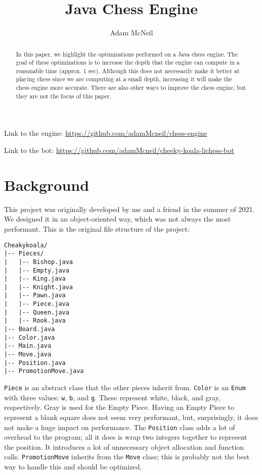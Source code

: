 \documentclass[sigconf]{acmart}
\begin{document}
\title{Java Chess Engine}

\author{Adam McNeil}


\begin{abstract}
In this paper, we highlight the optimizations performed on a Java chess engine.
The goal of these optimizations is to increase the depth that the engine can compute in a reasonable time (approx. 1 sec).
Although this does not necessarily make it better at playing chess since we are computing at a small depth, increasing it will make the chess engine more accurate.
There are also other ways to improve the chess engine, but they are not the focus of this paper.
\end{abstract}

\maketitle
Link to the engine: \url{https://github.com/adamMcneil/chess-engine}

Link to the bot: \url{https://github.com/adamMcneil/cheeky-koala-lichess-bot}
\section{Background}
This project was originally developed by me and a friend in the summer of 2021.
We designed it in an object-oriented way, which was not always the most performant.
This is the original file structure of the project:
\begin{verbatim}
Cheakykoala/
|-- Pieces/
|   |-- Bishop.java
|   |-- Empty.java
|   |-- King.java
|   |-- Knight.java
|   |-- Pawn.java
|   |-- Piece.java
|   |-- Queen.java
|   |-- Rook.java
|-- Board.java
|-- Color.java
|-- Main.java
|-- Move.java
|-- Position.java
|-- PromotionMove.java
\end{verbatim}
\texttt{Piece} is an abstract class that the other pieces inherit from.
\texttt{Color} is an \texttt{Enum} with three values: \texttt{w}, \texttt{b}, and \texttt{g}.
These represent white, black, and gray, respectively.
Gray is used for the Empty Piece. Having an Empty Piece to represent a blank square does not seem very performant, but, surprisingly, it does not make a huge impact on performance.
The \texttt{Position} class adds a lot of overhead to the program; all it does is wrap two integers together to represent the position.
It introduces a lot of unnecessary object allocation and function calls.
\texttt{PromotionMove} inherits from the \texttt{Move} class; this is probably not the best way to handle this and should be optimized.
\end{document}
